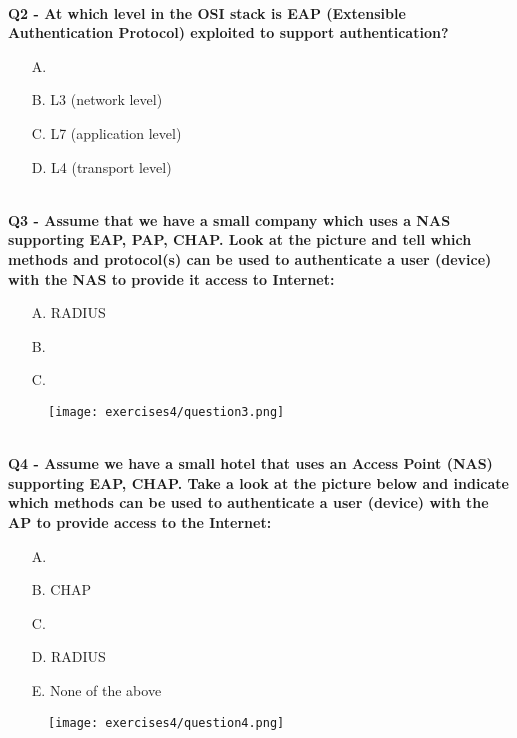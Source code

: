 \textbf{\\Q2 - At which level in the OSI stack is EAP (Extensible Authentication Protocol) exploited to support authentication?}
\begin{itemize}
    \item[A.] 
    \item[B.] L3 (network level)
    \item[C.] L7 (application level)
    \item[D.] L4 (transport level)
\end{itemize}

\textbf{\\Q3 - Assume that we have a small company which uses a NAS supporting EAP, PAP, CHAP. Look at the picture and tell which methods and protocol(s) can be used to authenticate a user (device) with the NAS to provide it access to Internet:}
\begin{itemize}
    \item[A.] RADIUS
    \item[B.] 
    \item[C.] 
\end{itemize}
\begin{figure}[h]
    \centering
    \texttt{[image: exercises4/question3.png]}
\end{figure}

\textbf{\\Q4 - Assume we have a small hotel that uses an Access Point (NAS) supporting EAP, CHAP. Take a look at the picture below and indicate which methods can be used to authenticate a user (device) with the AP to provide access to the Internet:}
\begin{itemize}
    \item[A.] 
    \item[B.] CHAP
    \item[C.] 
    \item[D.] RADIUS
    \item[E.] None of the above
\end{itemize}
\begin{figure}[h]
    \centering
    \texttt{[image: exercises4/question4.png]}
\end{figure}

